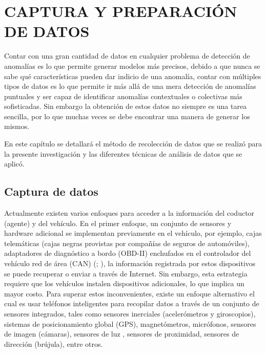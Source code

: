 
\chapter{\uppercase{Captura y preparaci\'{o}n de datos}}
\label{Capitulo 3}

Contar con una gran cantidad de datos en cualquier problema de detecci\'{o}n de anomal\'{i}as es lo que permite generar modelos m\'{a}s precisos, debido a que nunca se sabe qu\'{e} caracter\'{i}sticas pueden dar indicio de una anomal\'{i}a, contar con m\'{u}ltiples tipos de datos es lo que permite ir m\'{a}s all\'{a} de una mera detecci\'{o}n de anomal\'{i}as puntuales y ser capaz de identificar anomal\'{i}as contextuales o colectivas m\'{a}s sofisticadas. Sin embargo la obtenci\'{o}n de estos datos no siempre es una tarea sencilla, por lo que muchas veces se debe encontrar una manera de generar los mismos.

\vspace{5mm} %

En este cap\'{i}tulo se detallar\'{a} el m\'{e}todo de recolecci\'{o}n de datos que se realiz\'{o} para la presente investigaci\'{o}n y las diferentes t\'{e}cnicas de an\'{a}lisis de datos que se aplic\'{o}.

\section{Captura de datos} \label{cap:CapDatos}

Actualmente existen varios enfoques para acceder a la información del coductor (agente) y del vehículo. En el primer enfoque, un conjunto de sensores y hardware adicional se implementan previamente en el veh\'{i}culo, por ejemplo, cajas telemáticas (cajas negras provistas por compañías de seguros de automóviles), adaptadores de diagnóstico a bordo (OBD-II) enchufados en el controlador del vehículo red de área (CAN) (; ), la información registrada por estos dispositivos se puede recuperar o enviar a través de Internet. Sin embargo, esta estrategia requiere que los vehículos instalen dispositivos adicionales, lo que implica un mayor costo. Para superar estos inconvenientes, existe un enfoque alternativo el cual es usar teléfonos inteligentes para recopilar datos a través de un conjunto de sensores integrados, tales como sensores inerciales (acelerómetros y giroscopios), sistemas de posicionamiento global (GPS), magnetómetros, micrófonos, sensores de imagen (cámaras), sensores de luz , sensores de proximidad, sensores de dirección (brújula), entre otros.

